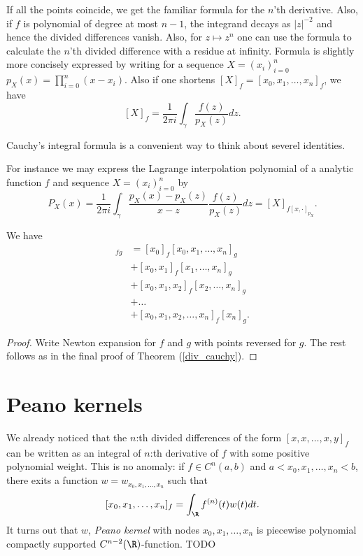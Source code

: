 If all the points coincide, we get the familiar formula for the $n$'th derivative. Also, if $f$ is polynomial of degree at most $n - 1$, the integrand decays as $|z|^{-2}$ and hence the divided differences vanish. Also, for $z \mapsto z^{n}$ one can use the formula to calculate the $n$'th divided difference with a residue at infinity. Formula is slightly more concisely expressed by writing for a sequence $X = (x_{i})_{i = 0}^{n}$ $p_{X}(x) = \prod_{i = 0}^{n} (x - x_{i})$. Also if one shortens $[X]_{f} = [x_{0}, x_{1}, \ldots, x_{n}]_{f}$, we have
\[
	[X]_{f} = \frac{1}{2 \pi i} \int_{\gamma} \frac{f(z)}{p_{X}(z)} dz.
\]

Cauchy's integral formula is a convenient way to think about severel identities.

\begin{esim}
For instance we may express the Lagrange interpolation polynomial of a analytic function $f$ and sequence $X = (x_{i})_{i = 0}^{n}$ by
\[
	P_{X}(x) = \frac{1}{2 \pi i} \int_{\gamma} \frac{p_{X}(x) - p_{X}(z)}{x - z}\frac{f(z)}{p_{X}(z)} dz = [X]_{f [x, \cdot]_{p_{X}}}.
\]
\end{esim}

\begin{prop}
	We have
	\begin{align*}
		[x_{0}, x_{1}, \ldots, x_{n}]_{f g} &= [x_{0}]_{f} [x_{0}, x_{1}, \ldots, x_{n}]_{g} \\
		&+ [x_{0}, x_{1}]_{f} [x_{1}, \ldots, x_{n}]_{g} \\
		&+ [x_{0}, x_{1}, x_{2}]_{f} [x_{2}, \ldots, x_{n}]_{g} \\
		&+ \ldots \\
		&+ [x_{0}, x_{1}, x_{2}, \ldots, x_{n}]_{f} [x_{n}]_{g}.
	\end{align*}
\end{prop}
\begin{proof}
	Write Newton expansion for $f$ and $g$ with points reversed for $g$. The rest follows as in the final proof of Theorem (\ref{div_cauchy}).
\end{proof}

\section{Peano kernels}

We already noticed that the $n$:th divided differences of the form $[x, x, \ldots, x, y]_{f}$ can be written as an integral of $n$:th derivative of $f$ with some positive polynomial weight. This is no anomaly: if $f \in C^{n}(a, b)$ and $a < x_{0}, x_{1}, \ldots, x_{n} < b$, there exits a function $w = w_{x_{0}, x_{1}, \ldots, x_{n}}$ such that
\[
	[x_{0}, x_{1}, \ldots, x_{n}]_{f} = \int_{\R} f^{(n)}(t) w(t) dt.
\]
It turns out that $w$, \textit{Peano kernel} with nodes $x_{0}, x_{1}, \ldots, x_{n}$ is piecewise polynomial compactly supported $C^{n - 2}(\R)$-function. TODO

